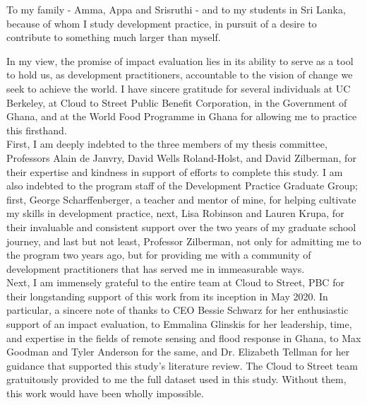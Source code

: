 \documentclass[masters]{ucbthesis}
\begin{document}
\newpage\null\thispagestyle{empty}\newpage
\begin{frontmatter}

\begin{dedication}
\null\vfil
\begin{center}
To my family - Amma, Appa and Srisruthi - and to my students in Sri Lanka, because of whom I study development practice, in pursuit of a desire to contribute to something much larger than myself.
\end{center}
\vfil\null
\end{dedication}


\tableofcontents
\clearpage
\listoffigures
\clearpage
\listoftables

\begin{acknowledgements}

In my view, the promise of impact evaluation lies in its ability to serve as a tool to hold us, as development practitioners, accountable to the vision of change we seek to achieve the world. I have sincere gratitude for several individuals at UC Berkeley, at Cloud to Street Public Benefit Corporation, in the Government of Ghana, and at the World Food Programme in Ghana for allowing me to practice this firsthand.\\

First, I am deeply indebted to the three members of my thesis committee, Professors Alain de Janvry, David Wells Roland-Holst, and David Zilberman, for their expertise and kindness in support of efforts to complete this study. I am also indebted to the program staff of the Development Practice Graduate Group; first, George Scharffenberger, a teacher and mentor of mine, for helping cultivate my skills in development practice, next, Lisa Robinson and Lauren Krupa, for their invaluable and consistent support over the two years of my graduate school journey, and last but not least, Professor Zilberman, not only for admitting me to the program two years ago, but for providing me with a community of development practitioners that has served me in immeasurable ways.\\

Next, I am immensely grateful to the entire team at Cloud to Street, PBC for their longstanding support of this work from its inception in May 2020. In particular, a sincere note of thanks to CEO Bessie Schwarz for her enthusiastic support of an impact evaluation, to Emmalina Glinskis for her leadership, time, and expertise in the fields of remote sensing and flood response in Ghana, to Max Goodman and Tyler Anderson for the same, and Dr. Elizabeth Tellman for her guidance that supported this study’s literature review. The Cloud to Street team gratuitously provided to me the full dataset used in this study. Without them, this work would have been wholly impossible.\\


\end{acknowledgements}
\end{frontmatter}
\end{document}
